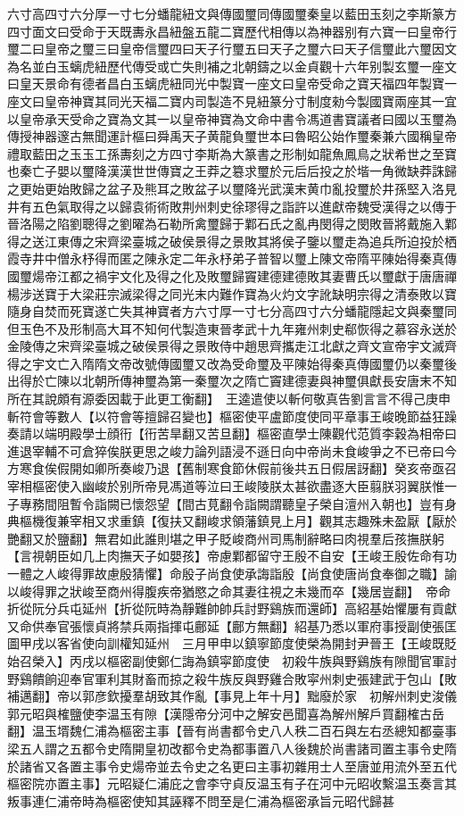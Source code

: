 六寸高四寸六分厚一寸七分蟠龍紐文與傳國璽同傳國璽秦皇以藍田玉刻之李斯篆方四寸面文曰受命于天既夀永昌紐盤五龍二寶歷代相傳以為神器别有六寶一曰皇帝行璽二曰皇帝之璽三曰皇帝信璽四曰天子行璽五曰天子之璽六曰天子信璽此六璽因文為名並白玉螭虎紐歷代傳受或亡失則補之北朝鑄之以金貞觀十六年别製玄璽一座文曰皇天景命有德者昌白玉螭虎紐同光中製寶一座文曰皇帝受命之寶天福四年製寶一座文曰皇帝神寶其同光天福二寶内司製造不見紐篆分寸制度勑今製國寶兩座其一宜以皇帝承天受命之寶為文其一以皇帝神寶為文命中書令馮道書寶議者曰國以玉璽為傳授神器邃古無聞運計樞曰舜禹天子黄龍負璽世本曰魯昭公始作璽秦兼六國稱皇帝禮取藍田之玉玉工孫夀刻之方四寸李斯為大篆書之形制如龍魚鳳鳥之狀希世之至寶也秦亡子嬰以璽降漢漢世世傳寶之王莽之簒求璽於元后后投之於堦一角微缺莽誅歸之更始更始敗歸之盆子及熊耳之敗盆子以璽降光武漢末黄巾亂投璽於井孫堅入洛見井有五色氣取得之以歸袁術術敗荆州刺史徐璆得之詣許以進獻帝魏受漢得之以傳于晉洛陽之陷劉聰得之劉曜為石勒所禽璽歸于鄴石氏之亂冉閔得之閔敗晉將戴施入鄴得之送江東傳之宋齊梁臺城之破侯景得之景敗其將侯子鑒以璽走為追兵所迫投於栖霞寺井中僧永杼得而匿之陳永定二年永杼弟子普智以璽上陳文帝隋平陳始得秦真傳國璽煬帝江都之禍宇文化及得之化及敗璽歸竇建德建德敗其妻曹氏以璽獻于唐唐禪楊涉送寶于大梁莊宗滅梁得之同光末内難作寶為火灼文字訛缺明宗得之清泰敗以寶隨身自焚而死寶遂亡失其神寶者方六寸厚一寸七分高四寸六分蟠龍隱起文與秦璽同但玉色不及形制高大耳不知何代製造東晉孝武十九年雍州刺史郗恢得之慕容永送於金陵傳之宋齊梁臺城之破侯景得之景敗侍中趙思齊攜走江北獻之齊文宣帝宇文滅齊得之宇文亡入隋隋文帝改號傳國璽又改為受命璽及平陳始得秦真傳國璽仍以秦璽後出得於亡陳以北朝所傳神璽為第一秦璽次之隋亡竇建德妻與神璽俱獻長安唐末不知所在其說頗有源委因載于此更工衡翻】　王逵遣使以斬何敬真告劉言言不得己庚申斬符會等數人【以符會等擅歸召變也】樞密使平盧節度使同平章事王峻晚節益狂躁奏請以端明殿學士顔衎【衎苦旱翻又苦旦翻】樞密直學士陳觀代范質李穀為相帝曰進退宰輔不可倉猝俟朕更思之峻力論列語浸不遜日向中帝尚未食峻爭之不已帝曰今方寒食俟假開如卿所奏峻乃退【舊制寒食節休假前後共五日假居訝翻】癸亥帝亟召宰相樞密使入幽峻於别所帝見馮道等泣曰王峻陵朕太甚欲盡逐大臣翦朕羽翼朕惟一子專務間阻暫令詣闕已懷怨望【間古莧翻令詣闕謂聽皇子榮自澶州入朝也】豈有身典樞機復兼宰相又求重鎮【復扶又翻峻求領藩鎮見上月】觀其志趣殊未盈厭【厭於艷翻又於鹽翻】無君如此誰則堪之甲子貶峻商州司馬制辭略曰肉視羣后孩撫朕躬【言視朝臣如几上肉撫天子如嬰孩】帝慮鄴都留守王殷不自安【王峻王殷佐命有功一體之人峻得罪故慮殷猜懼】命殷子尚食使承誨詣殷【尚食使唐尚食奉御之職】諭以峻得罪之狀峻至商州得腹疾帝猶愍之命其妻往視之未幾而卒【幾居豈翻】　帝命折從阮分兵屯延州【折從阮時為靜難帥帥兵討野鷄族而還師】高紹基始懼屢有貢獻又命供奉官張懷貞將禁兵兩指揮屯鄜延【鄜方無翻】紹基乃悉以軍府事授副使張匡圖甲戌以客省使向訓權知延州　三月甲申以鎮寧節度使榮為開封尹晉王【王峻既貶始召榮入】丙戌以樞密副使鄭仁誨為鎮寜節度使　初殺牛族與野鷄族有隙聞官軍討野鷄饋餉迎奉官軍利其財畜而掠之殺牛族反與野雞合敗寜州刺史張建武于包山【敗補邁翻】帝以郭彦欽擾羣胡致其作亂【事見上年十月】黜廢於家　初解州刺史浚儀郭元昭與榷鹽使李温玉有隙【漢隱帝分河中之解安邑聞喜為解州解戶買翻榷古岳翻】温玉壻魏仁浦為樞密主事【晉有尚書都令史八人秩二百石與左右丞總知都臺事梁五人謂之五都令史隋開皇初改都令史為都事置八人後魏於尚書諸司置主事令史隋於諸省又各置主事令史煬帝並去令史之名更曰主事初雜用士人至唐並用流外至五代樞密院亦置主事】元昭疑仁浦庇之會李守貞反温玉有子在河中元昭收繫温玉奏言其叛事連仁浦帝時為樞密使知其誣釋不問至是仁浦為樞密承旨元昭代歸甚